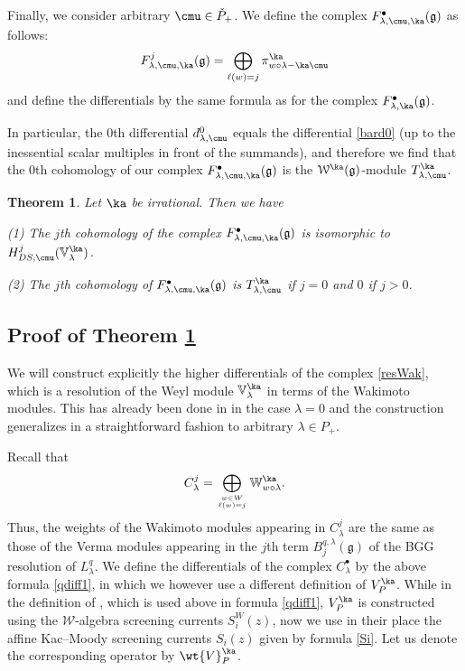 \documentclass{amsart}
\newcommand{\Wak}[2]{\mathbb{W}_{#1}^{#2}}
\newcommand{\+}{\mathop{\oplus}}
\renewcommand{\*}{{\otimes}}
\newcommand{\mc}{\mathcal}
\newcommand{\mf}{\mathfrak}
\newcommand{\mb}{\mathbb}
\newcommand{\g}{\mf{g}}
\newcommand{\lam}{\lambda}
\theoremstyle{theorem}
\newtheorem{Th}{Theorem}[section]
\theoremstyle{remark}
\numberwithin{equation}{section}
\begin{document}
\medskip

Finally, we consider arbitrary $\cmu \in \check{P}_+$. We define the
complex $F^\bullet_{\lam,\cmu,\ka}(\g)$ as follows:
$$
F^j_{\lam,\cmu,\ka}(\g) = \bigoplus_{\ell(w)=j} \pi^\ka_{w \circ \lam - \ka\cmu}
$$
and define the differentials by the same formula as for the complex
$F^\bullet_{\lam,\ka}(\g)$.

In particular, the $0$th differential $d^0_{\lam,\cmu}$ equals the
differential \eqref{bard0} (up to the inessential scalar multiples in
front of the summands), and therefore we find that the $0$th
cohomology of our complex $F^\bullet_{\lam,\cmu,\ka}(\g)$ is
the ${\mc W}^\ka(\g)$-module $T^\ka_{\lam,\cmu}$.

\begin{Th}    \label{Th:res}
Let $\ka$ be irrational. Then we have

(1) The $j$th cohomology of the complex
$F^\bullet_{\lam,\cmu,\ka}(\g)$ is isomorphic to
$H^j_{DS,\cmu}({\mathbb V}^\ka_\lam)$.

(2) The $j$th cohomology of $F^\bullet_{\lam,\cmu,\ka}(\g)$ is
$T^\ka_{\lam,\cmu}$ if $j=0$ and $0$ if $j>0$.
\end{Th}

\subsection{Proof of Theorem \ref{Th:res}}

We will construct explicitly the higher differentials of the complex
\eqref{resWak}, which is a resolution of the Weyl module ${\mb
  V}^\ka_\lam$ in terms of the Wakimoto modules. This has already been
done in \cite{F:cargese,FF:wak} in the case $\lam=0$ and the
construction generalizes in a straightforward fashion to arbitrary
$\lam \in P_+$.

Recall that
$$
C^j_\lam=\bigoplus_{w\in W\atop \ell(w)=j}\Wak{w\circ \lam}{\ka}.
$$
Thus, the weights of the Wakimoto modules appearing in $C^j_\lam$ are
the same as those of the Verma modules appearing in the $j$th term
$B^{q,\lam}_j(\g)$ of the BGG resolution of $L^q_\lam$. We define the
differentials of the complex $C^\bullet_\lam$ by the above formula
\eqref{qdiff1}, in which we however use a different definition of
$V_P^\ka$. While in the definition of \cite{FF93}, which is used above
in formula \eqref{qdiff1}, $V_P^\ka$ is constructed using the ${\mc
  W}$-algebra screening currents $S^W_i(z)$, now we use in their place
the affine Kac--Moody screening currents $S_i(z)$ given by formula
\eqref{Si}. Let us denote the corresponding operator by
$\wt{V}_P^\ka$.
\end{document}
